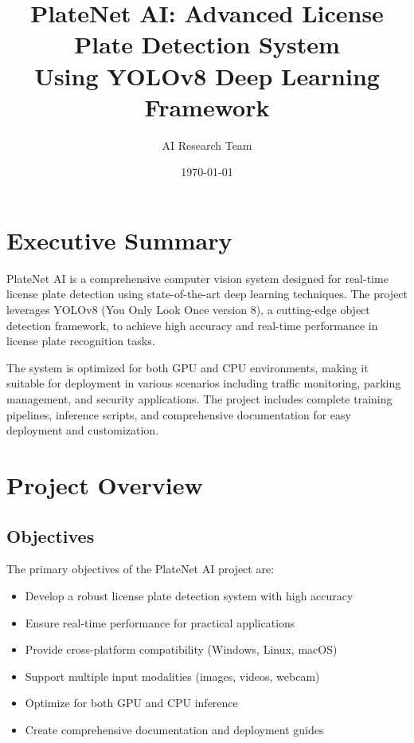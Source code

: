 \documentclass[12pt,a4paper]{article}
\title{\textbf{PlateNet AI: Advanced License Plate Detection System\\Using YOLOv8 Deep Learning Framework}}
\author{AI Research Team}
\date{\today}
\begin{document}
\maketitle

\tableofcontents
\newpage

\section{Executive Summary}

PlateNet AI is a comprehensive computer vision system designed for real-time license plate detection using state-of-the-art deep learning techniques. The project leverages YOLOv8 (You Only Look Once version 8), a cutting-edge object detection framework, to achieve high accuracy and real-time performance in license plate recognition tasks.

The system is optimized for both GPU and CPU environments, making it suitable for deployment in various scenarios including traffic monitoring, parking management, and security applications. The project includes complete training pipelines, inference scripts, and comprehensive documentation for easy deployment and customization.

\section{Project Overview}

\subsection{Objectives}
The primary objectives of the PlateNet AI project are:

\begin{itemize}
    \item Develop a robust license plate detection system with high accuracy
    \item Ensure real-time performance for practical applications
    \item Provide cross-platform compatibility (Windows, Linux, macOS)
    \item Support multiple input modalities (images, videos, webcam)
    \item Optimize for both GPU and CPU inference
    \item Create comprehensive documentation and deployment guides
\end{itemize}
\end{document}
